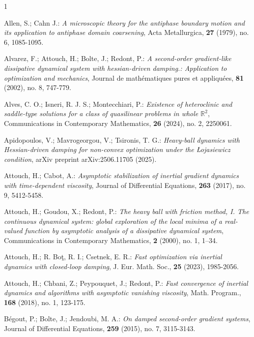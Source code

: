 \documentclass[12pt]{amsart}
\numberwithin{equation}{section}
\begin{document}

\begin{thebibliography}{1} 
	
 Allen, S.; Cahn J.: {\it A microscopic theory for the antiphase boundary motion and its application to antiphase domain coarsening}, Acta Metallurgica, {\bf 27} (1979), no. 6, 1085-1095.	

 Alvarez, F.; Attouch, H.; Bolte, J.; Redont, P.: {\it A second-order gradient-like dissipative dynamical system with hessian-driven damping.: Application to optimization and mechanics}, Journal de mathématiques pures et appliquées, {\bf 81} (2002), no. 8, 747-779.

 Alves, C. O.; Isneri, R. J. S.; Montecchiari, P.: {\it Existence of heteroclinic and saddle-type solutions for a class of quasilinear problems in whole $\mathbb{R}^2$}, Communications in Contemporary Mathematics, {\bf 26} (2024), no. 2, 2250061. 

 Apidopoulos, V.; Mavrogeorgou, V.; Tsironis, T. G.: {\it Heavy-ball dynamics with Hessian-driven damping for non-convex optimization under the {\L}ojasiewicz condition}, arXiv preprint arXiv:2506.11705 (2025).

 Attouch, H.; Cabot, A.: {\it Asymptotic stabilization of inertial gradient dynamics with time-dependent viscosity}, Journal of Differential Equations, {\bf 263} (2017), no. 9, 5412-5458.

 Attouch, H.; Goudou, X.; Redont, P.: {\it The heavy ball with friction method, I. The continuous dynamical system: global exploration of the local minima of a real-valued function by asymptotic analysis of a dissipative dynamical system}, Communications in Contemporary Mathematics, {\bf 2} (2000), no. 1, 1–34.	

 Attouch, H.; R. Bo\c{t}, R. I.; Csetnek, E. R.: {\it Fast optimization via inertial dynamics with closed-loop damping}, J. Eur. Math. Soc., {\bf 25} (2023), 1985-2056. 

 Attouch, H.; Chbani, Z.; Peypouquet, J.; Redont, P.: {\it Fast convergence of inertial dynamics and algorithms with asymptotic vanishing viscosity}, Math. Program., {\bf 168} (2018), no. 1, 123-175.

 Bégout, P.; Bolte, J.; Jendoubi, M. A.: {\it On damped second-order gradient systems}, Journal of Differential Equations, {\bf 259} (2015), no. 7, 3115-3143.


\end{thebibliography}
\end{document}
